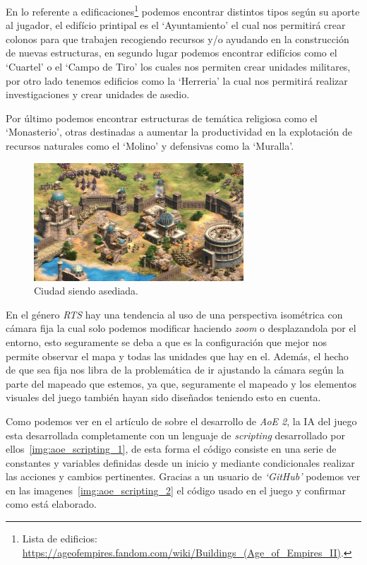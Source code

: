 En lo referente a edificaciones\footnote{Lista de edificios: \url{https://ageofempires.fandom.com/wiki/Buildings_(Age_of_Empires_II)}.}
podemos encontrar distintos tipos según su aporte al jugador,
el edifício printipal es el `Ayuntamiento' el cual nos permitirá crear colonos para que trabajen
recogiendo recursos y/o ayudando en la construcción de nuevas estructuras, en segundo lugar podemos
encontrar edifícios como el `Cuartel' o el `Campo de Tiro' los cuales nos permiten crear unidades
militares, por otro lado tenemos edificios como la `Herreria' la cual nos permitirá realizar investigaciones
y crear unidades de asedio.

Por último podemos encontrar estructuras de temática religiosa como el `Monasterio', otras 
destinadas a aumentar la productividad en la explotación de recursos naturales como el 
`Molino' y defensivas como la `Muralla'. 

\begin{figure}[ht]
\centering
\includegraphics[width=0.7\textwidth]{imagenes/marco_teo/referentes/aoe_2.png}
\caption{Ciudad siendo asediada.}
\label{img:aoe_2}
\end{figure}

En el género \textit{\ac{RTS}} hay una tendencia al uso de una perspectiva isométrica con cámara fija
la cual solo podemos modificar haciendo \textit{zoom} o desplazandola por el entorno, esto seguramente
se deba a que es la configuración que mejor nos permite observar el mapa y todas las unidades que
hay en el. Además, el hecho de que sea fija nos libra de la problemática de ir ajustando la
cámara según la parte del mapeado que estemos, ya que, seguramente el mapeado y los elementos
visuales del juego también hayan sido diseñados teniendo esto en cuenta.

Como podemos ver en el artículo de \citeauthor*{Pritchard2000} sobre el desarrollo de \textit{\ac{AoE} 2},
la \ac{IA} del juego esta desarrollada completamente con un lenguaje de \textit{scripting} desarrollado
por ellos~\ref{img:aoe_scripting_1}, de esta forma el código consiste en una serie de constantes y variables definidas desde un
inicio y mediante condicionales realizar las acciones  y cambios pertinentes. Gracias a un usuario
de \textit{`GitHub'} podemos ver en las imagenes~\ref{img:aoe_scripting_2} el código usado en el juego
y confirmar como está elaborado.

